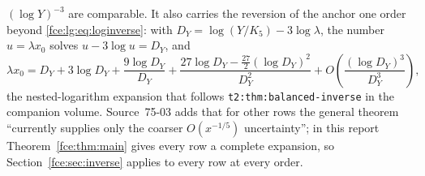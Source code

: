 \documentclass[11pt,a4paper]{article}
\numberwithin{equation}{section}
\theoremstyle{definition}\newtheorem{definition}[theorem]{Definition}
\theoremstyle{remark}\newtheorem{remark}[theorem]{Remark}
\begin{document}
$(\log Y)^{-3}$ are comparable. It also carries the reversion of the anchor
one order beyond \eqref{fce:lg:eq:loginverse}: with
$D_Y=\log(Y/K_5)-3\log\lambda$, the number $u=\lambda x_0$ solves
$u-3\log u=D_Y$, and
\begin{equation}\label{fce:kk:eq:loganchor}
 \lambda x_0=D_Y+3\log D_Y+\frac{9\log D_Y}{D_Y}
 +\frac{27\log D_Y-\tfrac{27}{2}(\log D_Y)^2}{D_Y^2}
 +O\!\left(\frac{(\log D_Y)^3}{D_Y^3}\right),
\end{equation}
the nested-logarithm expansion that follows \texttt{t2:thm:balanced-inverse}
in the companion volume. Source~75-03 adds that for other rows the general
theorem ``currently supplies only the coarser $O(x^{-1/5})$ uncertainty'';
in this report Theorem~\ref{fce:thm:main} gives every row a complete
expansion, so Section~\ref{fce:sec:inverse} applies to every row at every
order.
\end{document}
